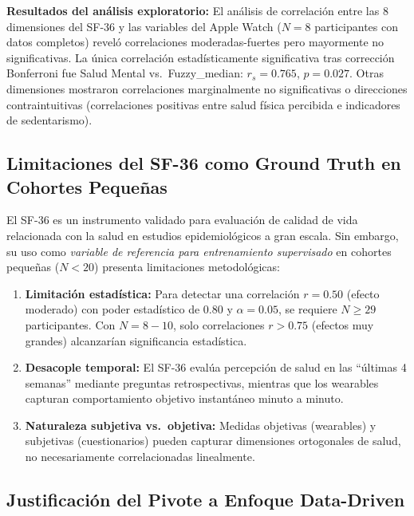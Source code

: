 \textbf{Resultados del análisis exploratorio:} El análisis de correlación entre las 8 dimensiones del SF-36 y las variables del Apple Watch ($N=8$ participantes con datos completos) reveló correlaciones moderadas-fuertes pero mayormente no significativas. La única correlación estadísticamente significativa tras corrección Bonferroni fue Salud Mental vs.\ Fuzzy\_median: $r_s = 0.765$, $p = 0.027$. Otras dimensiones mostraron correlaciones marginalmente no significativas o direcciones contraintuitivas (correlaciones positivas entre salud física percibida e indicadores de sedentarismo).

\subsection{Limitaciones del SF-36 como Ground Truth en Cohortes Pequeñas}
\label{subsec:limitaciones_sf36}

El SF-36 es un instrumento validado para evaluación de calidad de vida relacionada con la salud en estudios epidemiológicos a gran escala. Sin embargo, su uso como \textit{variable de referencia para entrenamiento supervisado} en cohortes pequeñas ($N < 20$) presenta limitaciones metodológicas:

\begin{enumerate}
    \item \textbf{Limitación estadística:} Para detectar una correlación $r = 0.50$ (efecto moderado) con poder estadístico de 0.80 y $\alpha = 0.05$, se requiere $N \geq 29$ participantes. Con $N=8-10$, solo correlaciones $r > 0.75$ (efectos muy grandes) alcanzarían significancia estadística.
    
    \item \textbf{Desacople temporal:} El SF-36 evalúa percepción de salud en las ``últimas 4 semanas'' mediante preguntas retrospectivas, mientras que los wearables capturan comportamiento objetivo instantáneo minuto a minuto.
    
    \item \textbf{Naturaleza subjetiva vs.\ objetiva:} Medidas objetivas (wearables) y subjetivas (cuestionarios) pueden capturar dimensiones ortogonales de salud, no necesariamente correlacionadas linealmente.
\end{enumerate}

\subsection{Justificación del Pivote a Enfoque Data-Driven}
\label{subsec:justificacion_pivote}

